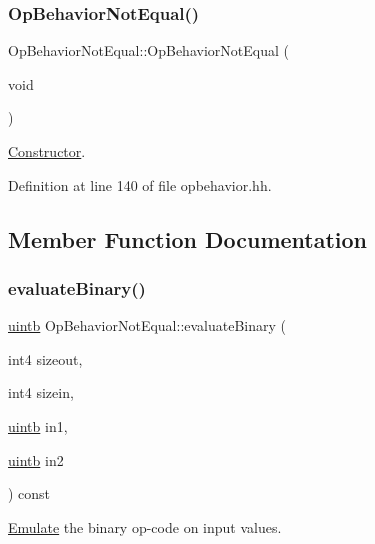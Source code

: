 \subsubsection{\texorpdfstring{OpBehaviorNotEqual()}{OpBehaviorNotEqual()}}
{\footnotesize\ttfamily Op\+Behavior\+Not\+Equal\+::\+Op\+Behavior\+Not\+Equal (\begin{DoxyParamCaption}\item[{void}]{ }\end{DoxyParamCaption})\hspace{0.3cm}{\ttfamily [inline]}}



\mbox{\hyperlink{class_constructor}{Constructor}}. 



Definition at line 140 of file opbehavior.\+hh.



\subsection{Member Function Documentation}
\mbox{\label{class_op_behavior_not_equal_a8d79390685e0675b04685dea66155e55}} 
\subsubsection{\texorpdfstring{evaluateBinary()}{evaluateBinary()}}
{\footnotesize\ttfamily \mbox{\hyperlink{types_8h_a2db313c5d32a12b01d26ac9b3bca178f}{uintb}} Op\+Behavior\+Not\+Equal\+::evaluate\+Binary (\begin{DoxyParamCaption}\item[{int4}]{sizeout,  }\item[{int4}]{sizein,  }\item[{\mbox{\hyperlink{types_8h_a2db313c5d32a12b01d26ac9b3bca178f}{uintb}}}]{in1,  }\item[{\mbox{\hyperlink{types_8h_a2db313c5d32a12b01d26ac9b3bca178f}{uintb}}}]{in2 }\end{DoxyParamCaption}) const\hspace{0.3cm}{\ttfamily [virtual]}}



\mbox{\hyperlink{class_emulate}{Emulate}} the binary op-\/code on input values. 


